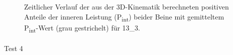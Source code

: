 \documentclass[
  letterpaper,
  DIV=11]{scrartcl}
\makeatletter
\let\oldparagraph\paragraph
\renewcommand{\paragraph}{
    \@ifstar
      \xxxParagraphStar
      \xxxParagraphNoStar
  }
\newcommand{\xxxParagraphStar}[1]{\oldparagraph*{#1}\mbox{}}
\newcommand{\xxxParagraphNoStar}[1]{\oldparagraph{#1}\mbox{}}
\makeatother
\begin{document}
\begin{figure}


\caption{\label{fig-PInt_Kinematik_13_3}Zeitlicher Verlauf der aus der
3D-Kinematik berechneten positiven Anteile der inneren Leistung
(P\textsubscript{int}) beider Beine mit gemitteltem
P\textsubscript{int}-Wert (grau gestrichelt) für 13\_3.}

\end{figure}%

\paragraph{Test 4}
\end{document}
